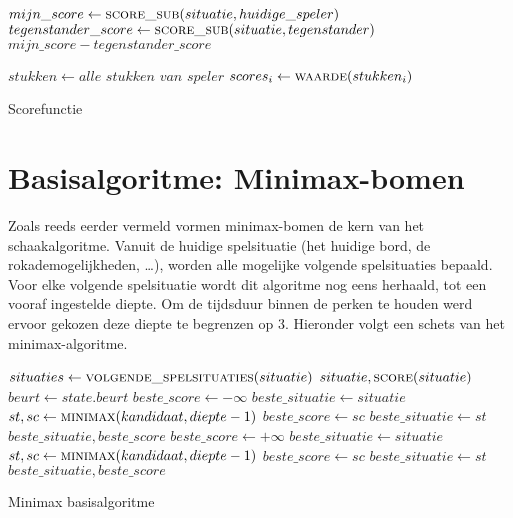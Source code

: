 \begin{algorithm}
	\begin{algorithmic}[1]
		\State $mijn\_score \gets \Call{score\_sub}{situatie, huidige\_speler}$
		\State $tegenstander\_score \gets \Call{score\_sub}{situatie, tegenstander}$
		\State \Return $mijn\_score - tegenstander\_score$
		\EndFunction

		\State $stukken \gets \textit{alle stukken van $speler$}$
		\State $scores_i \gets \Call{waarde}{stukken_i}$
		\State \Return {}
		\EndFunction
	\end{algorithmic}
	\caption{Scorefunctie}
\end{algorithm}

\newpage

\section{Basisalgoritme: Minimax-bomen}
Zoals reeds eerder vermeld vormen minimax-bomen de kern van het schaakalgoritme. Vanuit de huidige spelsituatie (het huidige bord, de rokademogelijkheden, \dots), worden alle mogelijke volgende spelsituaties bepaald. Voor elke volgende spelsituatie wordt dit algoritme nog eens herhaald, tot een vooraf ingestelde diepte. Om de tijdsduur binnen de perken te houden werd ervoor gekozen deze diepte te begrenzen op 3. Hieronder volgt een schets van het minimax-algoritme.

\begin{algorithm}
	\begin{algorithmic}[1]
			\State $situaties \gets \Call{volgende\_spelsituaties}{situatie}$
				\State \Return $situatie, \Call{score}{situatie}$
			\EndIf
			\State $beurt \gets state.beurt$
				\State $beste\_score \gets -\infty$
				\State $beste\_situatie \gets situatie$
					\State $st, sc \gets \Call{minimax}{kandidaat, diepte-1}$
						\State $beste\_score \gets sc$
						\State $beste\_situatie \gets st$
					\EndIf
				\EndFor
				\State \Return $beste\_situatie, beste\_score$
			\Else
				\State $beste\_score \gets +\infty$
				\State $beste\_situatie \gets situatie$
					\State $st, sc \gets \Call{minimax}{kandidaat, diepte-1}$
						\State $beste\_score \gets sc$
						\State $beste\_situatie \gets st$
					\EndIf
				\EndFor
				\State \Return $beste\_situatie, beste\_score$
			\EndIf
		\EndFunction
	\end{algorithmic}
	\caption{Minimax basisalgoritme}
\end{algorithm}

